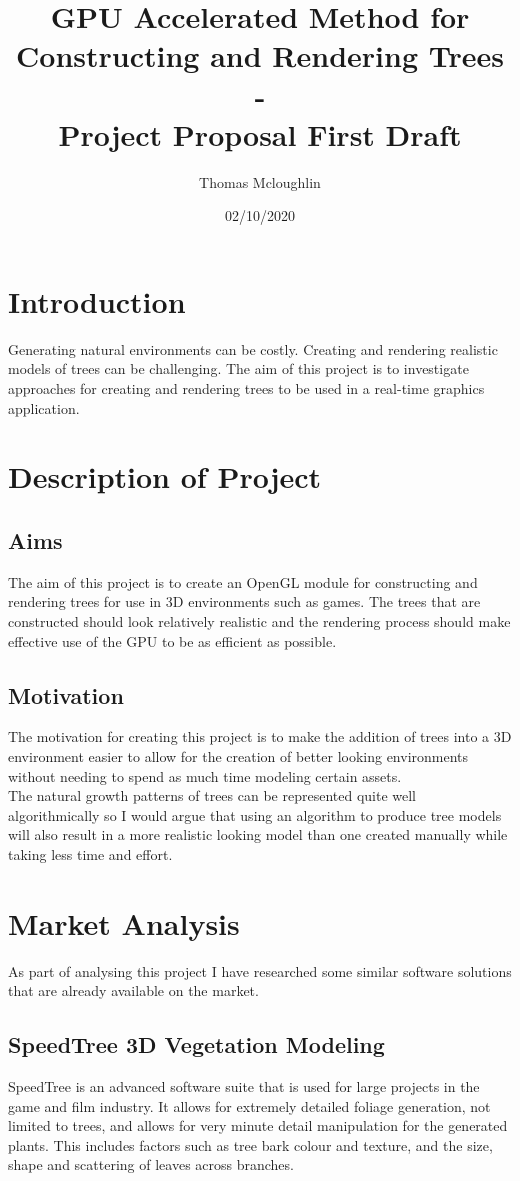 \documentclass[proposal]{cmpreport}
\title{GPU Accelerated Method for Constructing and Rendering Trees 
        \\ - \\ 
        Project Proposal First Draft}
\author{Thomas Mcloughlin}
\date{02/10/2020}
\begin{document}
\maketitle

\pagebreak
\section{Introduction}
Generating natural environments can be costly. Creating and rendering realistic 
models of trees can be challenging. The aim of this project is to investigate 
approaches for creating and rendering trees to be used in a real-time graphics 
application.

\section{Description of Project}

\subsection{Aims}
The aim of this project is to create an OpenGL module for constructing and rendering 
trees for use in 3D environments such as games. The trees that are constructed should 
look relatively realistic and the rendering process should make effective use of the 
GPU to be as efficient as possible.

\subsection{Motivation}
The motivation for creating this project is to make the addition of trees into a 3D 
environment easier to allow for the creation of better looking environments without 
needing to spend as much time modeling certain assets. \\
The natural growth patterns of trees can be represented quite well algorithmically so 
I would argue that using an algorithm to produce tree models will also result in a 
more realistic looking model than one created manually while taking less time and 
effort.

\section{Market Analysis}
As part of analysing this project I have researched some similar software solutions 
that are already available on the market.

\subsection{SpeedTree 3D Vegetation Modeling}
SpeedTree \cite{speedtree} is an advanced software suite that is used for large projects 
in the game and film industry. It allows for extremely detailed foliage generation, 
not limited to trees, and allows for very minute detail manipulation for the generated 
plants. This includes factors such as tree bark colour and texture, and the size, shape 
and scattering of leaves across branches.
\end{document}
